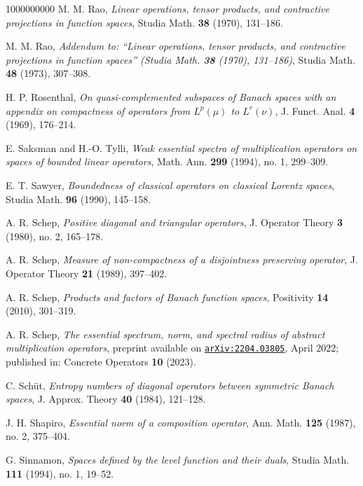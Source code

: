 \documentclass[11pt]{amsart}
\theoremstyle{definition}
\theoremstyle{definition}
\theoremstyle{definition}
\theoremstyle{definition}
\theoremstyle{definition}
\theoremstyle{definition}
\theoremstyle{definition}
\theoremstyle{definition}
\numberwithin{equation}{section}
\numberwithin{equation}{section}
\numberwithin{equation}{section}
\theoremstyle{definition}
\theoremstyle{definition}
\theoremstyle{definition}
\theoremstyle{definition}
\theoremstyle{definition}
\theoremstyle{definition}
\begin{document}
\begin{thebibliography}{1000000000}
	 M. M. Rao, {\it Linear operations, tensor products, and contractive projections in function spaces}, Studia Math. {\bf 38} (1970), 131--186.
	
	 M. M. Rao, {\it Addendum to: \enquote{Linear operations, tensor products, and contractive projections in function spaces} (Studia Math.
	{\bf 38} (1970), 131--186)}, Studia Math. {\bf 48} (1973), 307--308.
		
	 H. P. Rosenthal, {\it On quasi-complemented subspaces of Banach spaces with an appendix on compactness of operators from $L^p(\mu)$ to $L^r(\nu)$},
		J. Funct. Anal. {\bf 4} (1969), 176--214.
	
	 E. Saksman and H.-O. Tylli, {\it Weak essential spectra of multiplication operators on spaces of bounded linear operators}, Math. Ann. {\bf 299} (1994),
		no. 1, 299--309.
		
	 E. T. Sawyer, {\it Boundedness of classical operators on classical Lorentz spaces}, Studia Math. {\bf 96} (1990), 145--158.
		
	 A. R. Schep, {\it Positive diagonal and triangular operators}, J. Operator Theory {\bf 3} (1980), no. 2, 165--178.
	
	 A. R. Schep, {\it Measure of non-compactness of a disjointness preserving operator}, J. Operator Theory {\bf 21} (1989), 397--402.
		
	 A. R. Schep, {\it Products and factors of Banach function spaces}, Positivity {\bf 14} (2010), 301--319.
	
	 A. R. Schep, {\it The essential spectrum, norm, and spectral radius of abstract multiplication operators},
		preprint available on \href{https:/https://arXiv:2204.03805.pdf}{\texttt{arXiv:2204.03805}}, April 2022; published in: Concrete Operators {\bf 10} (2023).
		
	 C. Sch{\" u}t, {\it Entropy numbers of diagonal operators between symmetric Banach spaces}, J. Approx. Theory {\bf 40} (1984), 121--128.
	
	 J. H. Shapiro, {\it Essential norm of a composition operator}, Ann. Math. {\bf 125} (1987), no. 2, 375--404.
	
	 G. Sinnamon, {\it Spaces defined by the level function and their duals}, Studia Math. {\bf 111} (1994), no. 1, 19--52.
	

\end{thebibliography}
\end{document}
